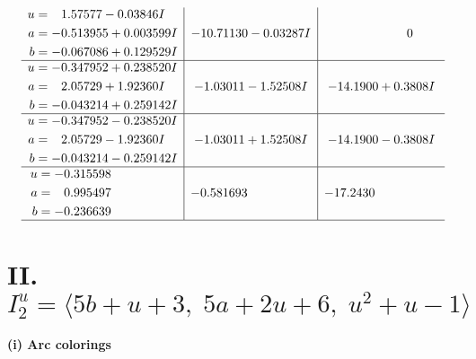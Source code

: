 \documentclass[1p]{elsarticle_modified}
\theoremstyle{definition}
\begin{document}
$$\begin{array}{c|c|c}
\begin{aligned}
u &= \phantom{-}1.57577 - 0.03846 I \\
a &= -0.513955 + 0.003599 I \\
b &= -0.067086 + 0.129529 I\end{aligned}
 & -10.71130 - 0.03287 I & \phantom{-0.000000 } 0 \\ \hline\begin{aligned}
u &= -0.347952 + 0.238520 I \\
a &= \phantom{-}2.05729 + 1.92360 I \\
b &= -0.043214 + 0.259142 I\end{aligned}
 & -1.03011 - 1.52508 I & -14.1900 + 0.3808 I \\ \hline\begin{aligned}
u &= -0.347952 - 0.238520 I \\
a &= \phantom{-}2.05729 - 1.92360 I \\
b &= -0.043214 - 0.259142 I\end{aligned}
 & -1.03011 + 1.52508 I & -14.1900 - 0.3808 I \\ \hline\begin{aligned}
u &= -0.315598\phantom{ +0.000000I} \\
a &= \phantom{-}0.995497\phantom{ +0.000000I} \\
b &= -0.236639\phantom{ +0.000000I}\end{aligned}
 & -0.581693\phantom{ +0.000000I} & -17.2430\phantom{ +0.000000I}\\
 \hline 
 \end{array}$$\newpage\newpage\renewcommand{\arraystretch}{1}
\centering \section*{II. $I^u_{2}= \langle 5 b+u+3,\;5 a+2 u+6,\;u^2+u-1 \rangle$}
\flushleft \textbf{(i) Arc colorings}\\
\end{document}
